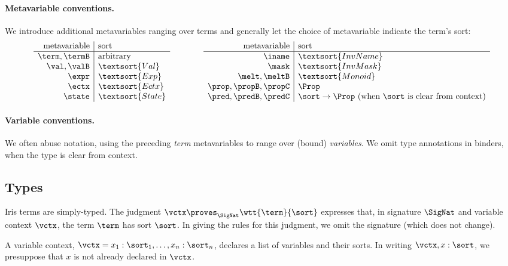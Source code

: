 \paragraph{Metavariable conventions.}
We introduce additional metavariables ranging over terms and generally let the choice of metavariable indicate the term's sort:
\[
\begin{array}{r|l}
 \text{metavariable} & \text{sort} \\\hline
  \term, \termB & \text{arbitrary} \\
  \val, \valB & \textsort{Val} \\
  \expr & \textsort{Exp} \\
  \ectx & \textsort{Ectx} \\
  \state & \textsort{State} \\
\end{array}
\qquad\qquad
\begin{array}{r|l}
 \text{metavariable} & \text{sort} \\\hline
  \iname & \textsort{InvName} \\
  \mask & \textsort{InvMask} \\
  \melt, \meltB & \textsort{Monoid} \\
  \prop, \propB, \propC & \Prop \\
  \pred, \predB, \predC & \sort\to\Prop \text{ (when $\sort$ is clear from context)} \\
\end{array}
\]

\paragraph{Variable conventions.}
We often abuse notation, using the preceding \emph{term} metavariables to range over (bound) \emph{variables}.
We omit type annotations in binders, when the type is clear from context.


\subsection{Types}\label{sec:types}

Iris terms are simply-typed.
The judgment $\vctx \proves_\SigNat \wtt{\term}{\sort}$ expresses that, in signature $\SigNat$ and variable context $\vctx$, the term $\term$ has sort $\sort$.
In giving the rules for this judgment, we omit the signature (which does not change).

A variable context, $\vctx = x_1:\sort_1, \dots, x_n:\sort_n$, declares a list of variables and their sorts.
In writing $\vctx, x:\sort$, we presuppose that $x$ is not already declared in $\vctx$.

